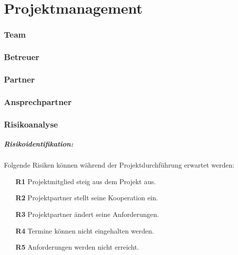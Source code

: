 \def \currentAuthor {Das Projektteam} %

\chapter{Projektmanagement}
\subsection{Team}
\subsection{Betreuer}
\subsection{Partner}
\subsection{Ansprechpartner}
\newpage

\subsection{Risikoanalyse}
\paragraph{Risikoidentifikation:}

Folgende Risiken können während der Projektdurchführung erwartet werden:
\begin{itemize}
	\item[\textbf{R1}] Projektmitglied steig aus dem Projekt aus.
	\item[\textbf{R2}] Projektpartner stellt seine Kooperation ein.
	\item[\textbf{R3}] Projektpartner ändert seine Anforderungen.
	\item[\textbf{R4}] Termine können nicht eingehalten werden.
	\item[\textbf{R5}] Anforderungen werden nicht erreicht.
\end{itemize}

